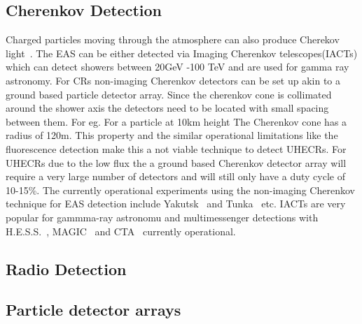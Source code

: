 \subsection*{Cherenkov Detection}
\label{sec:EAS_cher}
Charged particles moving through the atmosphere can also produce Cherekov light~\cite{}. The EAS can be either detected via Imaging Cherenkov telescopes(IACTs) which can detect showers between 20GeV -100 TeV and are used for gamma ray astronomy. For CRs non-imaging Cherenkov detectors can be set up akin to a ground based particle detector array. Since the cherenkov cone is collimated around the shower axis the detectors need to be located with small spacing between them. For eg. For a particle at 10km height The Cherenkov cone has a radius of 120m. This property and the similar operational limitations like the fluorescence detection make this a not viable technique to detect UHECRs. For UHECRs due to the low flux the a ground based Cherenkov detector array will require a very large number of detectors and will still only have a duty cycle of 10-15\%. The currently operational experiments using the non-imaging Cherenkov technique for EAS detection include Yakutsk~\cite{} and Tunka~\cite{} etc. IACTs are very popular for gammma-ray astronomu and multimessenger detections with H.E.S.S.~\cite{}, MAGIC~\cite{} and CTA~\cite{} currently operational. 

\subsection*{Radio Detection}
\label{sec:EAS_cher}

\subsection*{Particle detector arrays}
\label{sec:EAS_cher}


